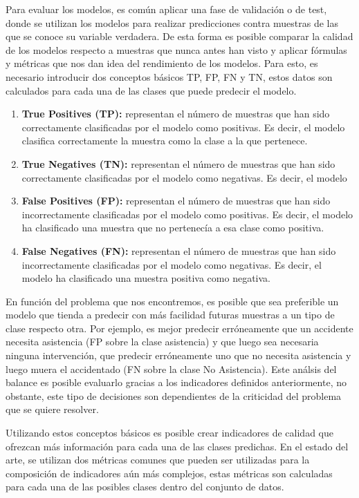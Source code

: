 \documentclass{uathesis-es}
\begin{document}
{	Para evaluar los modelos, es común aplicar una fase de validación o de test, donde se utilizan los modelos para realizar predicciones contra muestras de las que se conoce su variable verdadera. De esta forma es posible comparar la calidad de los modelos respecto a muestras que nunca antes han visto y aplicar fórmulas y métricas que nos dan idea del rendimiento de los modelos. Para esto, es necesario introducir dos conceptos básicos TP, FP, FN y TN, estos datos son calculados para cada una de las clases que puede predecir el modelo.
	
	\begin{enumerate}
		\item \textbf{True Positives (TP):} representan el número de muestras que han sido correctamente clasificadas por el modelo como positivas. Es decir, el modelo clasifica correctamente la muestra como la clase a la que pertenece.
		\item \textbf{True Negatives (TN):} representan el número de muestras que han sido correctamente clasificadas por el modelo como negativas. Es decir, el modelo
		\item \textbf{False Positives (FP):} representan el número de muestras que han sido incorrectamente clasificadas por el modelo como positivas. Es decir, el modelo ha clasificado una muestra que no pertenecía a esa clase como positiva.
		\item \textbf{False Negatives (FN):} representan el número de muestras que han sido incorrectamente clasificadas por el modelo como negativas. Es decir, el modelo ha clasificado una muestra positiva como negativa.
	\end{enumerate}
	
	En función del problema que nos encontremos, es posible que sea preferible un modelo que tienda a predecir con más facilidad futuras muestras a un tipo de clase respecto otra. Por ejemplo, es mejor predecir erróneamente que un accidente necesita asistencia (FP sobre la clase asistencia) y que luego sea necesaria ninguna intervención, que predecir erróneamente uno que no necesita asistencia y luego muera el accidentado (FN sobre la clase No Asistencia). Este análsis del balance es posible evaluarlo gracias a los indicadores definidos anteriormente, no obstante, este tipo de decisiones son dependientes de la criticidad del problema que se quiere resolver.
	
	Utilizando estos conceptos básicos es posible crear indicadores de calidad que ofrezcan más información para cada una de las clases predichas. En el estado del arte, se utilizan dos métricas comunes que pueden ser utilizadas para la composición de indicadores aún más complejos, estas métricas son calculadas para cada una de las posibles clases dentro del conjunto de datos.
	
}
\end{document}
